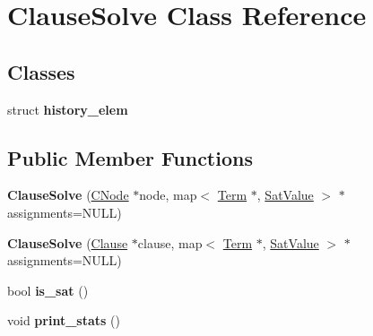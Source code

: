 \hypertarget{classClauseSolve}{\section{\-Clause\-Solve \-Class \-Reference}
\label{classClauseSolve}
}
\subsection*{\-Classes}
\begin{DoxyCompactItemize}
\item 
struct {\bfseries history\-\_\-elem}
\end{DoxyCompactItemize}
\subsection*{\-Public \-Member \-Functions}
\begin{DoxyCompactItemize}
\item 
\hypertarget{classClauseSolve_a7594792761da2b9e818f31fced46676d}{{\bfseries \-Clause\-Solve} (\hyperlink{classCNode}{\-C\-Node} $\ast$node, map$<$ \hyperlink{classTerm}{\-Term} $\ast$, \hyperlink{classSatValue}{\-Sat\-Value} $>$ $\ast$assignments=\-N\-U\-L\-L)}\label{classClauseSolve_a7594792761da2b9e818f31fced46676d}

\item 
\hypertarget{classClauseSolve_aceb5efa9b6af4cc28fb4e890d65cfd71}{{\bfseries \-Clause\-Solve} (\hyperlink{classClause}{\-Clause} $\ast$clause, map$<$ \hyperlink{classTerm}{\-Term} $\ast$, \hyperlink{classSatValue}{\-Sat\-Value} $>$ $\ast$assignments=\-N\-U\-L\-L)}\label{classClauseSolve_aceb5efa9b6af4cc28fb4e890d65cfd71}

\item 
\hypertarget{classClauseSolve_a1de13db3dc2a960d001281206418eea9}{bool {\bfseries is\-\_\-sat} ()}\label{classClauseSolve_a1de13db3dc2a960d001281206418eea9}

\item 
\hypertarget{classClauseSolve_a6d2d6816c8f799062d315ad12a86aacf}{void {\bfseries print\-\_\-stats} ()}\label{classClauseSolve_a6d2d6816c8f799062d315ad12a86aacf}

\end{DoxyCompactItemize}
